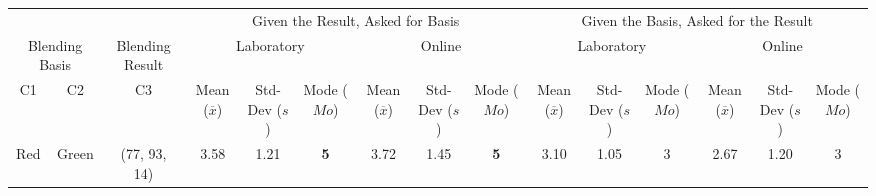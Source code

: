\begin{table}[htbp]
  \resizebox{\textwidth}{!} {
  \begin{tabular}{@{}ccclcccccccccccc@{}}
    \toprule
    \multicolumn{2}{c}{}                                                     & \multicolumn{2}{c}{}                                       & \multicolumn{6}{c}{Given the Result, Asked for Basis}                                                                                                                                                                               & \multicolumn{6}{c}{Given the Basis, Asked for the Result}                                                                                                                                                                                                                                                                   \\ \cmidrule(l){5-16}
    \multicolumn{2}{c}{\multirow{-2}{*}{Blending Basis}}                     & \multicolumn{2}{c}{\multirow{-2}{*}{Blending Result}}      & \multicolumn{3}{c}{Laboratory}                                                                                   & \multicolumn{3}{c}{Online}                                                                                       & \multicolumn{3}{c}{Laboratory}                                                                                                                      & \multicolumn{3}{c}{Online}                                                                                                                                            \\ \midrule
    C1                      & C2                                             & \multicolumn{2}{c|}{C3}                                    & Mean ($\overline{x}$)        & Std-Dev ($s$)         & Mode ($Mo$)                                             & Mean ($\overline{x}$)        & Std-Dev ($s$)         & \multicolumn{1}{c|}{Mode ($Mo$)}                        & Mean ($\overline{x}$)                          & Std-Dev ($s$)                          & Mode ($Mo$)                                             & Mean ($\overline{x}$)                          & Std-Dev ($s$)                          & \multicolumn{1}{c|}{Mode ($Mo$)}                                          \\ \midrule
    Red                     & \multicolumn{1}{c|}{Green}                     & \multicolumn{2}{c|}{\cellcolor[HTML]{FFFF00}(77, 93, 14)}  & \multicolumn{1}{c|}{3.58} & \multicolumn{1}{c|}{1.21}  & \multicolumn{1}{c|}{\cellcolor[HTML]{32CB00}\textbf{5}} & \multicolumn{1}{c|}{3.72} & \multicolumn{1}{c|}{1.45}  & \multicolumn{1}{c||}{\cellcolor[HTML]{32CB00}\textbf{5}} & \multicolumn{1}{c|}{3.10}                   & \multicolumn{1}{c|}{1.05}                   & \multicolumn{1}{c|}{3}                                  & \multicolumn{1}{c|}{2.67}                   & \multicolumn{1}{c|}{1.20}                   & \multicolumn{1}{c|}{3}                                                    \\ \midrule

\end{tabular}}
\end{table}
